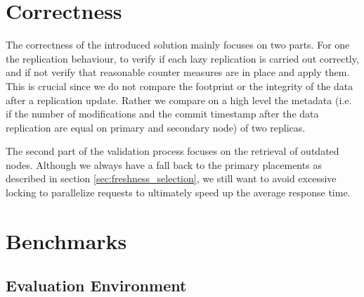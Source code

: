 \section{Correctness}

The correctness of the introduced solution mainly focuses on two parts. For one the replication behaviour, to verify if each lazy replication is carried out correctly,
and if not verify that reasonable counter measures are in place and apply them. This is crucial since we do not compare the footprint or the integrity of the data after 
a replication update. Rather we compare on a high level the metadata 
(i.e. if the number of modifications and the commit timestamp after the data replication are equal on primary and secondary node) of two replicas. 

The second part of the validation process focuses on the retrieval of outdated nodes. Although we always have a fall back to the primary placements as described in section \ref{sec:freshness_selection},
we still want to avoid excessive locking to parallelize requests to ultimately speed up the average response time.


\todoMissing{\ref{sec:constraints, lazy -> eager and outdated -> refreshable}}



\section{Benchmarks}




\subsection{Evaluation Environment}

